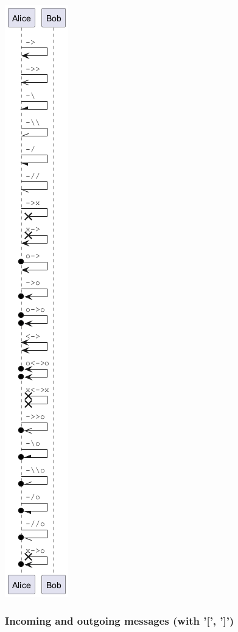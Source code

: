 \begin{center}
\includegraphics[scale=0.60]{imgw/img-8236cd98b4731207bf5b3bcffe83cc00.png}
\end{center}


\subsubsection{Incoming and outgoing messages (with '[', ']')}
